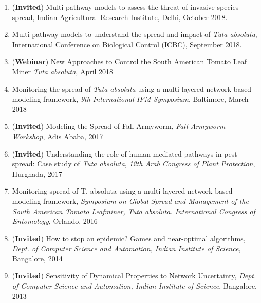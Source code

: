 \documentclass[margin,10pt]{res} %
\begin{document}
\begin{resume}
{\begin{enumerate}[1.]
Technology, Dharwad, October 2018.
\item (\textbf{Invited}) Multi-pathway models to assess the threat of
invasive species spread, Indian Agricultural Research Institute, Delhi,
October 2018.
\item Multi-pathway models to understand the spread and impact of
\emph{Tuta
absoluta}, International Conference on Biological Control (ICBC),
September 2018.
\item (\textbf{Webinar}) New Approaches to Control the South American Tomato
Leaf Miner \emph{Tuta absoluta}, April 2018
\item Monitoring the spread of {\it Tuta absoluta} using a
multi-layered network based modeling framework, \emph{9th International
IPM Symposium}, Baltimore, March 2018
    \item (\textbf{Invited}) Modeling the Spread of Fall Armyworm,
    \emph{Fall Armyworm Workshop}, Adis Ababa, 2017
    \item (\textbf{Invited}) Understanding the role of human-mediated
    pathways in pest spread: Case study of \emph{Tuta absoluta}, \emph{12th
    Arab Congress of Plant Protection}, Hurghada, 2017
\item Monitoring spread of T. absoluta using a multi-layered network
based modeling framework, \emph{Symposium on Global Spread and Management
of the South American Tomato Leafminer, Tuta absoluta. International
Congress of Entomology}, Orlando, 2016
\item (\textbf{Invited}) How to stop an epidemic?  Games and near-optimal
algorithms, \emph{Dept. of Computer Science and Automation, Indian
Institute of Science}, Bangalore, 2014
\item (\textbf{Invited}) Sensitivity of Dynamical Properties to Network
Uncertainty, \emph{Dept. of Computer Science and Automation, Indian
Institute of Science}, Bangalore, 2013
\end{enumerate}
}

\iftoggle{compact}{
\section{\textnormal{\textsc{Selected publications}}}
\begin{enumerate}[1.]%
\item \bibentry{adiga2022network}
\item \bibentry{poudel2020predicting}
\item \bibentry{mcnitt2019assessing}
\item \bibentry{maharjan2019predicting}
\item \bibentry{venkatramanan2020modeling}
\item \bibentry{campos2017western}
\item \bibentry{zhang2016near}
\item \bibentry{mishra2023reconstructing}
\item \bibentry{adiga2021realistic}
\item \bibentry{adiga2014sensitivity}
\end{enumerate}
}{
}
\end{resume}
\end{document}

